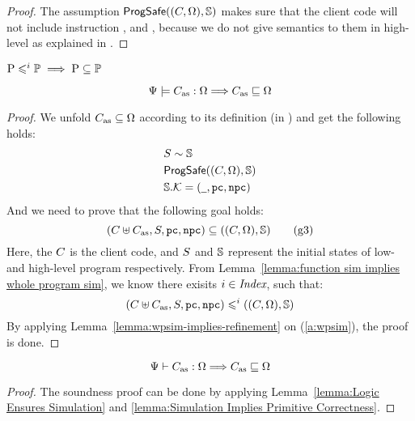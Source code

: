 {\begin{proof}
    The assumption $\textsf{ProgSafe}((C, \Omega), \mathbb{S})$ 
    makes sure that the client code will not include instruction 
    \csave{}, \crestore{} and \cwr{}, because we do not give 
    semantics to them in high-level as explained in 
    \Sec{\ref{subsec:High-level Pseudo-SPARCv8 Language}}. 
\end{proof}

\begin{lemma}
    \label{lemma:wpsim-implies-refinement}
    \em
    $\text{P} \leqslant^{i} \mathbb{P} \implies \text{P} \subseteq \mathbb{P}$  
\end{lemma}

\begin{lemma}
    \em
    \label{lemma:Simulation Implies Primitive Correctness}
    \[
        {\Psi} \models {C_{\text{as}}} : {\Omega} 
        \Longrightarrow
        C_{\text{as}} \sqsubseteq \Omega
    \]
\end{lemma}
\begin{proof}
    We unfold $C_{\text{as}} \subseteq \Omega$ according to 
    its definition (in \Def{\ref{def:prim-correctness}}) 
    and get the following holds: 
    \begin{align}
        & {S} \sim {\mathbb{S}} \\
        & \textsf{ProgSafe}((C, \Omega), \mathbb{S}) \\
        & \mathbb{S}.\mathcal{K} = 
            (\underline{\ \,}, \texttt{pc}, \texttt{npc}) 
    \end{align}
    And we need to prove that the following goal holds:
    \begin{equation}
        (C\uplus C_{\text{as}}, S, \texttt{pc}, \texttt{npc})
        \subseteq
        ((C, \Omega), \mathbb{S})
        \tag{g3} \label{g3}
    \end{equation}
    Here, the $C$ is the client code, and 
    $S$ and $\mathbb{S}$ represent the initial states 
    of low- and high-level program respectively. 
    From Lemma~\ref{lemma:function sim implies whole program sim}, 
    we know there exisits $i \in \textit{Index}$, such that: 
    \begin{equation}
        (C\uplus C_{\text{as}}, S, \texttt{pc}, \texttt{npc})
        \leqslant^{i}
        ((C, \Omega), \mathbb{S}) \label{a:wpsim}
    \end{equation}
    By applying Lemma~\ref{lemma:wpsim-implies-refinement}
    on (\ref{a:wpsim}), the proof is done. 
\end{proof}

\begin{theorem}
    \em
    \label{thm:logic soundness}
    \[
        {\Psi} \vdash {C_{\text{as}}} : {\Omega} \Longrightarrow
        C_{\text{as}} \sqsubseteq \Omega
    \]
\end{theorem}
\begin{proof}
    The soundness proof can be done by applying 
    Lemma~\ref{lemma:Logic Ensures Simulation} and 
    \ref{lemma:Simulation Implies Primitive Correctness}.
\end{proof}
}

